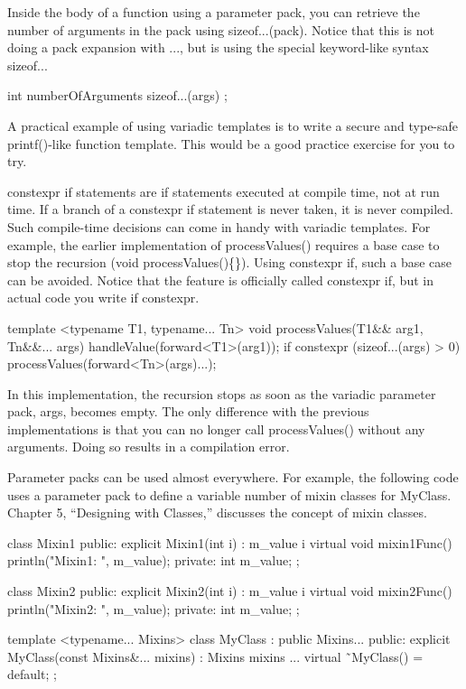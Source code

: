 Inside the body of a function using a parameter pack, you can retrieve the number of arguments in the pack using sizeof...(pack). Notice that this is not doing a pack expansion with ..., but is using the special keyword-like syntax sizeof...

\begin{cpp}
int numberOfArguments { sizeof...(args) };
\end{cpp}

A practical example of using variadic templates is to write a secure and type-safe printf()-like function template. This would be a good practice exercise for you to try.


constexpr if statements are if statements executed at compile time, not at run time. If a branch of a constexpr if statement is never taken, it is never compiled. Such compile-time decisions can come in handy with variadic templates. For example, the earlier implementation of processValues() requires a base case to stop the recursion (void processValues()\{\}). Using constexpr if, such a base case can be avoided. Notice that the feature is officially called constexpr if, but in actual code you write if constexpr.

\begin{cpp}
template <typename T1, typename... Tn>
void processValues(T1&& arg1, Tn&&... args)
{
    handleValue(forward<T1>(arg1));
    if constexpr (sizeof...(args) > 0) {
        processValues(forward<Tn>(args)...);
    }
}
\end{cpp}

In this implementation, the recursion stops as soon as the variadic parameter pack, args, becomes empty. The only difference with the previous implementations is that you can no longer call processValues() without any arguments. Doing so results in a compilation error.


Parameter packs can be used almost everywhere. For example, the following code uses a parameter pack to define a variable number of mixin classes for MyClass. Chapter 5, “Designing with Classes,” discusses the concept of mixin classes.

\begin{cpp}
class Mixin1
{
    public:
        explicit Mixin1(int i) : m_value { i } {}
        virtual void mixin1Func() { println("Mixin1: {}", m_value); }
    private:
        int m_value;
};

class Mixin2
{
    public:
        explicit Mixin2(int i) : m_value { i } {}
        virtual void mixin2Func() { println("Mixin2: {}", m_value); }
    private:
        int m_value;
};

template <typename... Mixins>
class MyClass : public Mixins...
{
    public:
        explicit MyClass(const Mixins&... mixins) : Mixins { mixins }... {}
        virtual ˜MyClass() = default;
};
\end{cpp}

